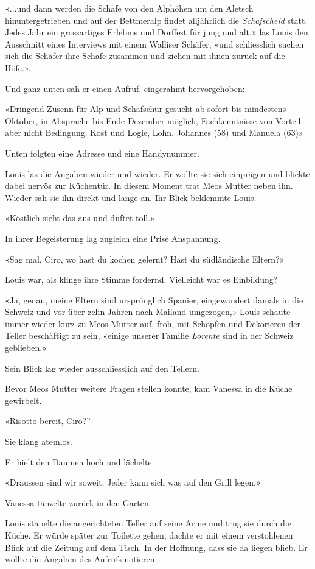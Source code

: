 «...und dann werden die Schafe von den Alphöhen um den Aletsch
hinuntergetrieben und auf der Bettmeralp findet alljährlich die
\emph{Schafscheid} statt. Jedes Jahr ein grossartiges Erlebnis und
Dorffest für jung und alt,» las Louis den Ausschnitt eines Interviews
mit einem Walliser Schäfer, «und schliesslich suchen sich die Schäfer
ihre Schafe zusammen und ziehen mit ihnen zurück auf die Höfe.».

Und ganz unten sah er einen Aufruf, eingerahmt hervorgehoben:

«Dringend Zusenn für Alp und Schafschur gesucht ab sofort bis mindestens
Oktober, in Absprache bis Ende Dezember möglich, Fachkenntnisse von
Vorteil aber nicht Bedingung. Kost und Logie, Lohn. Johannes (58) und
Manuela (63)»

Unten folgten eine Adresse und eine Handynummer.

Louis las die Angaben wieder und wieder. Er wollte sie sich einprägen
und blickte dabei nervös zur Küchentür. In diesem Moment trat Meos
Mutter neben ihn. Wieder sah sie ihn direkt und lange an. Ihr Blick
beklemmte Louis.

«Köstlich sieht das aus und duftet toll.»

In ihrer Begeisterung lag zugleich eine Prise Anspannung.

«Sag mal, Ciro, wo hast du kochen gelernt? Hast du südländische Eltern?»

Louis war, als klinge ihre Stimme fordernd. Vielleicht war es
Einbildung?

«Ja, genau, meine Eltern sind ursprünglich Spanier, eingewandert damals
in die Schweiz und vor über zehn Jahren nach Mailand umgezogen,» Louis
schaute immer wieder kurz zu Meos Mutter auf, froh, mit Schöpfen und
Dekorieren der Teller beschäftigt zu sein, «einige unserer Familie
\emph{Lorente} sind in der Schweiz geblieben.»

Sein Blick lag wieder ausschliesslich auf den Tellern.

Bevor Meos Mutter weitere Fragen stellen konnte, kam Vanessa in die
Küche gewirbelt.

«Risotto bereit, Ciro?''

Sie klang atemlos.

Er hielt den Daumen hoch und lächelte.

«Draussen sind wir soweit. Jeder kann sich was auf den Grill legen.»

Vanessa tänzelte zurück in den Garten.

Louis stapelte die angerichteten Teller auf seine Arme und trug sie
durch die Küche. Er würde später zur Toilette gehen, dachte er mit einem
verstohlenen Blick auf die Zeitung auf dem Tisch. In der Hoffnung, dass
sie da liegen blieb. Er wollte die Angaben des Aufrufs notieren.

